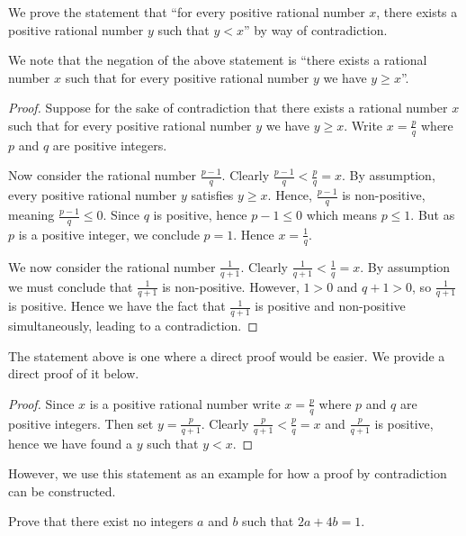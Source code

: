 \begin{example}
    We prove the statement that ``for every positive rational number $x$, there exists a positive rational number $y$ such that $y < x$'' by way of contradiction.
    
    We note that the negation of the above statement is ``there exists a rational number $x$ such that for every positive rational number $y$ we have $y \geq x$''.
    \begin{proof}
        Suppose for the sake of contradiction that there exists a rational number $x$ such that for every positive rational number $y$ we have $y \geq x$. Write $x = \frac pq$ where $p$ and $q$ are positive integers.
        
        Now consider the rational number $\frac{p-1}{q}$. Clearly $\frac{p-1}{q} < \frac pq = x$. By assumption, every positive rational number $y$ satisfies $y \geq x$. Hence, $\frac{p-1}{q}$ is non-positive, meaning $\frac{p-1}{q} \leq 0$. Since $q$ is positive, hence $p - 1 \leq 0$ which means $p \leq 1$. But as $p$ is a positive integer, we conclude $p = 1$. Hence $x = \frac 1q$.
        
        We now consider the rational number $\frac{1}{q+1}$. Clearly $\frac{1}{q+1} < \frac{1}{q} = x$. By assumption we must conclude that $\frac{1}{q+1}$ is non-positive. However, $1 > 0$ and $q + 1 > 0$, so $\frac{1}{q+1}$ is positive. Hence we have the fact that $\frac{1}{q+1}$ is positive and non-positive simultaneously, leading to a contradiction.
    \end{proof}
\end{example}
\begin{remark}
    The statement above is one where a direct proof would be easier. We provide a direct proof of it below.
    \begin{proof}
        Since $x$ is a positive rational number write $x = \frac pq$ where $p$ and $q$ are positive integers. Then set $y = \frac{p}{q+1}$. Clearly $\frac{p}{q+1} < \frac{p}{q} = x$ and $\frac{p}{q+1}$ is positive, hence we have found a $y$ such that $y < x$.
    \end{proof}
    However, we use this statement as an example for how a proof by contradiction can be constructed.
\end{remark}

\begin{exercise}
    Prove that there exist no integers $a$ and $b$ such that $2a + 4b = 1$.
\end{exercise}

